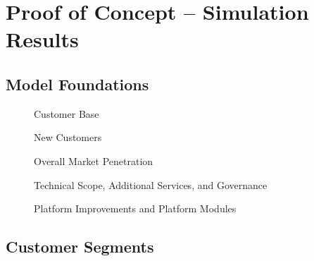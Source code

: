 \chapter{Proof of Concept -- Simulation Results}\label{ch:app05}

\section{Model Foundations}\label{ch:app05:mf}

\begin{figure}[htb]
	\centering
	
	\caption{Customer Base}
\end{figure}

\begin{figure}[htb]
	\centering
	
	\caption{New Customers}
\end{figure}

\begin{figure}[htb]
	\centering
	
	\caption{Overall Market Penetration}
\end{figure}

\begin{figure}[htb]
	\centering
	
	\caption{Technical Scope, Additional Services, and Governance}
\end{figure}

\begin{figure}[htb]
	\centering
	
	\caption{Platform Improvements and Platform Modules}
\end{figure}

\clearpage
\section{Customer Segments}\label{ch:app05:cs}

